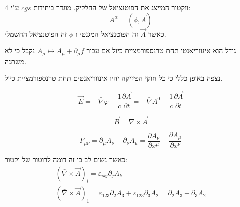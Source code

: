 \documentclass{tstextbook}
\begin{document}
\begin{definition}[4 פוטנציאל]
4 ווקטור המייצג את הפוטנציאל של החלקיק. מוגדר ביחידות \(cgs\) ע"י: 
$$A^{\alpha}=(\phi,\vec{A})$$
כאשר \(\vec{A}\) זה הפוטנציאל המגנטי ו-\(\phi\) זה הפוטנציאל החשמלי.

\end{definition}
\begin{definition}
גודל הוא אינווריאנטי תחת טרנספורמציית כיול אם עבור \(A_{\mu}\mapsto A_{\mu}+\partial_{\mu }f\) נקבל כי לא משתנה.

\end{definition}
\begin{remark}
נצפה באופן כללי כי כל חוקי הפיזיקה יהיו אינווריאנטים תחת טרנספורמציית כיול.

\end{remark}
\begin{definition}
$${\vec{E}}=-{\bar{\nabla}}\varphi-{\frac{1}{c}}{\frac{\partial{\vec{A}}}{\partial t}}=-\bar{\nabla} A^0 - \frac{1}{c}\frac{\partial \vec{A}}{\partial t} $$

\end{definition}
\begin{definition}
$$ {\vec{B}}={\bar{\nabla}}\times{\vec{A}}$$

\end{definition}
\begin{definition}
$$F_{\mu \nu}=\partial_{\mu}A_{\nu}-\partial_{\nu}A_{\mu}=\frac{\partial A_{\nu}}{\partial x^\mu}-\frac{\partial A_{\mu}}{\partial x^\nu} $$

\end{definition}
כאשר נשים לב כי זה דומה לרוטור של וקטור:
$$\begin{gather}\left( \bar{\nabla} \times \vec{A} \right)_{i}=\varepsilon_{ikj}\partial_{j}A_{k}  \\\left( \bar{\nabla} \times \vec{A} \right)_{1}=\varepsilon_{123} \partial_{2}A_{3}+\varepsilon_{123}\partial_{3}A_{2}=\partial_{2}A_{3}-\partial_{3}A_{2}
\end{gather}$$
\end{document}
